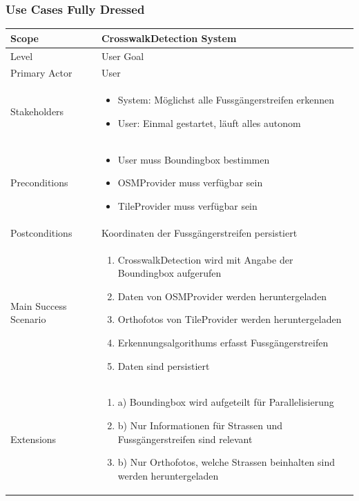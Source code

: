 \subsubsection{Use Cases Fully Dressed}
\begin{table}[H]
    \begin{tabular}{ | p{4cm} | p{10cm}  | }
    \hline
    Scope & CrosswalkDetection System   \\ \hline
	Level  & User Goal \\ \hline
	Primary Actor & User \\ \hline 
	Stakeholders & 
	\begin{itemize}
		\item System: Möglichst alle Fussgängerstreifen erkennen
		\item User: Einmal gestartet, läuft alles autonom
    \end{itemize} \\ \hline
	Preconditions & 
		\begin{itemize}
		\item User muss Boundingbox bestimmen
		\item OSMProvider muss verfügbar sein
		\item TileProvider muss verfügbar sein
    \end{itemize} \\ \hline
	Postconditions & Koordinaten der Fussgängerstreifen persistiert \\ \hline
	Main Success Scenario & 
	\begin{enumerate}
		\item CrosswalkDetection wird mit Angabe der Boundingbox aufgerufen
		\item Daten von OSMProvider werden heruntergeladen
		\item Orthofotos von TileProvider werden heruntergeladen
		\item Erkennungsalgorithums erfasst Fussgängerstreifen
		\item Daten sind persistiert
	\end{enumerate} \\ \hline
	Extensions & 
	\begin{enumerate}
		\item a) Boundingbox wird aufgeteilt für Parallelisierung
		\item b) Nur Informationen für Strassen und Fussgängerstreifen sind relevant
		\item b) Nur Orthofotos, welche Strassen beinhalten sind werden heruntergeladen
	\end{enumerate} \\ \hline

\end{tabular}
\end{table}
